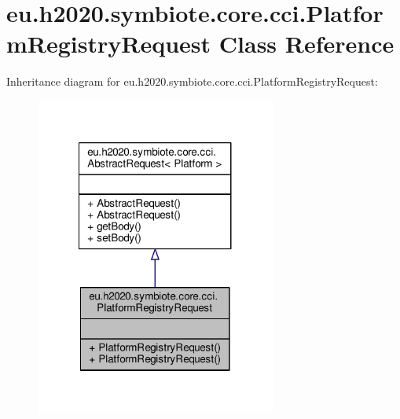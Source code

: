 \hypertarget{classeu_1_1h2020_1_1symbiote_1_1core_1_1cci_1_1PlatformRegistryRequest}{}\section{eu.\+h2020.\+symbiote.\+core.\+cci.\+Platform\+Registry\+Request Class Reference}
\label{classeu_1_1h2020_1_1symbiote_1_1core_1_1cci_1_1PlatformRegistryRequest}


Inheritance diagram for eu.\+h2020.\+symbiote.\+core.\+cci.\+Platform\+Registry\+Request\+:
\nopagebreak
\begin{figure}[H]
\begin{center}
\leavevmode
\includegraphics[width=224pt]{classeu_1_1h2020_1_1symbiote_1_1core_1_1cci_1_1PlatformRegistryRequest__inherit__graph}
\end{center}
\end{figure}


